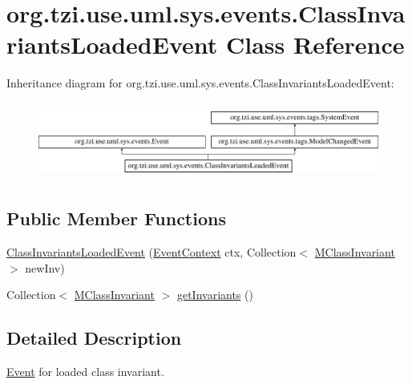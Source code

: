\hypertarget{classorg_1_1tzi_1_1use_1_1uml_1_1sys_1_1events_1_1_class_invariants_loaded_event}{\section{org.\-tzi.\-use.\-uml.\-sys.\-events.\-Class\-Invariants\-Loaded\-Event Class Reference}
\label{classorg_1_1tzi_1_1use_1_1uml_1_1sys_1_1events_1_1_class_invariants_loaded_event}
}
Inheritance diagram for org.\-tzi.\-use.\-uml.\-sys.\-events.\-Class\-Invariants\-Loaded\-Event\-:\begin{figure}[H]
\begin{center}
\leavevmode
\includegraphics[height=2.545455cm]{classorg_1_1tzi_1_1use_1_1uml_1_1sys_1_1events_1_1_class_invariants_loaded_event}
\end{center}
\end{figure}
\subsection*{Public Member Functions}
\begin{DoxyCompactItemize}
\item 
\hyperlink{classorg_1_1tzi_1_1use_1_1uml_1_1sys_1_1events_1_1_class_invariants_loaded_event_a73022b5996d3f07a57a124f8bfd501b1}{Class\-Invariants\-Loaded\-Event} (\hyperlink{enumorg_1_1tzi_1_1use_1_1uml_1_1sys_1_1events_1_1tags_1_1_event_context}{Event\-Context} ctx, Collection$<$ \hyperlink{classorg_1_1tzi_1_1use_1_1uml_1_1mm_1_1_m_class_invariant}{M\-Class\-Invariant} $>$ new\-Inv)
\item 
Collection$<$ \hyperlink{classorg_1_1tzi_1_1use_1_1uml_1_1mm_1_1_m_class_invariant}{M\-Class\-Invariant} $>$ \hyperlink{classorg_1_1tzi_1_1use_1_1uml_1_1sys_1_1events_1_1_class_invariants_loaded_event_a23dc12e11afefff80849350974c23dba}{get\-Invariants} ()
\end{DoxyCompactItemize}


\subsection{Detailed Description}
\hyperlink{classorg_1_1tzi_1_1use_1_1uml_1_1sys_1_1events_1_1_event}{Event} for loaded class invariant.

